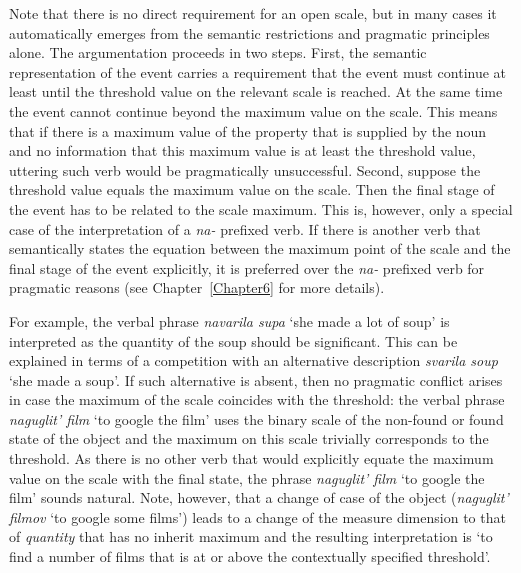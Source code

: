 Note that there is no direct requirement for an open scale, but in many cases it automatically emerges from the semantic restrictions and pragmatic principles alone. The argumentation proceeds in two steps. First, the semantic representation of the event carries a requirement that the event must continue at least until the threshold value on the relevant scale is reached. At the same time the event cannot continue beyond the maximum value on the scale. This means that if there is a maximum value of the property that is supplied by the noun and no information that this maximum value is at least the threshold value, uttering such verb would be pragmatically unsuccessful. Second, suppose the threshold value equals the maximum value on the scale. Then the final stage of the event has to be related to the scale maximum. This is, however, only a special case of the interpretation of a \textit{na-}  prefixed verb. If there is another verb that semantically states the equation between the maximum point of the scale and the final stage of the event explicitly, it is preferred over the \textit{na-}  prefixed verb for pragmatic reasons (see Chapter~\ref{Chapter6} for more details). 

For example, the verbal phrase \textit{navarila supa} `she made a lot of soup' is interpreted as the quantity of the soup should be significant. This can be explained in terms of a competition with an alternative description \textit{svarila soup} `she made a soup'. If such alternative is absent, then no pragmatic conflict arises in case the maximum of the scale coincides with the threshold: the verbal phrase \textit{naguglit' film} `to google the film' uses the binary scale of the non-found or found state of the object and the maximum on this scale trivially corresponds to the threshold. As there is no other verb that would explicitly equate the maximum value on the scale with the final state, the phrase \textit{naguglit' film} `to google the film' sounds natural. Note, however, that a change of case of the object (\textit{naguglit' filmov} `to google some films') leads to a change of the measure dimension to that of \textit{quantity} that has no inherit maximum and the resulting interpretation is `to find a number of films that is at or above the contextually specified threshold'.

